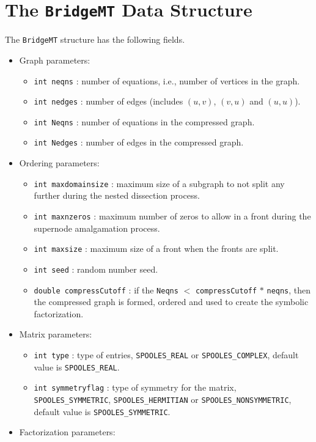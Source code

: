 \section{The \texttt{BridgeMT} Data Structure}
\label{section:BridgeMT:dataStructure}
\par
The {\tt BridgeMT} structure has the following fields.
\begin{itemize}
%
\item Graph parameters:
\begin{itemize} 
\item
{\tt int neqns} : number of equations, 
i.e., number of vertices in the graph.
\item
{\tt int nedges} : number of edges 
(includes $(u,v)$, $(v,u)$ and $(u,u)$).
\item
{\tt int Neqns} : number of equations in the compressed graph.
\item
{\tt int Nedges} : number of edges in the compressed graph.
\end{itemize}
%
\item Ordering parameters:
\begin{itemize}
\item
{\tt int maxdomainsize} : maximum size of a subgraph to not split any
further during the nested dissection process.
\item
{\tt int maxnzeros} : maximum number of zeros to allow in a front 
during the supernode amalgamation process.
\item
{\tt int maxsize} : maximum size of a front when the fronts are split.
\item
{\tt int seed} : random number seed.
\item
{\tt double compressCutoff} : if the \texttt{Neqns} $<$
\texttt{compressCutoff} $*$ \texttt{neqns}, then the compressed
graph is formed, ordered and used to create the symbolic
factorization.
\end{itemize}
%
\item Matrix parameters:
\begin{itemize}
\item
{\tt int type} : type of entries,
{\tt SPOOLES\_REAL} or {\tt SPOOLES\_COMPLEX},
default value is {\tt SPOOLES\_REAL}.
\item
{\tt int symmetryflag} : type of symmetry for the matrix,
{\tt SPOOLES\_SYMMETRIC}, {\tt SPOOLES\_HERMITIAN}
or {\tt SPOOLES\_NONSYMMETRIC},
default value is {\tt SPOOLES\_SYMMETRIC}.
\end{itemize}
%
\item Factorization parameters:

\end{itemize}
